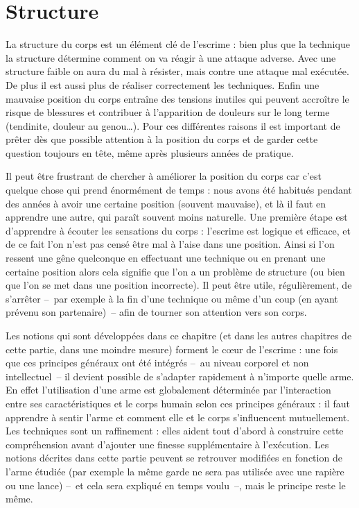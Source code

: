 \chapter{Structure}


La structure du corps est un élément clé de l'escrime : bien plus que la technique la structure détermine comment on va réagir à une attaque adverse.
Avec une structure faible on aura du mal à résister, mais contre une attaque mal exécutée.
De plus il est aussi plus de réaliser correctement les techniques.
Enfin une mauvaise position du corps entraîne des tensions inutiles qui peuvent accroître le risque de blessures et contribuer à l'apparition de douleurs sur le long terme (tendinite, douleur au genou…).
Pour ces différentes raisons il est important de prêter dès que possible attention à la position du corps et de garder cette question toujours en tête, même après plusieurs années de pratique.

Il peut être frustrant de chercher à améliorer la position du corps car c'est quelque chose qui prend énormément de temps : nous avons été habitués pendant des années à avoir une certaine position (souvent mauvaise), et là il faut en apprendre une autre, qui paraît souvent moins naturelle.
Une première étape est d'apprendre à écouter les sensations du corps : l'escrime est logique et efficace, et de ce fait l'on n'est pas censé être mal à l'aise dans une position.
Ainsi si l'on ressent une gêne quelconque en effectuant une technique ou en prenant une certaine position alors cela signifie que l'on a un problème de structure (ou bien que l'on se met dans une position incorrecte).
Il peut être utile, régulièrement, de s'arrêter -- par exemple à la fin d'une technique ou même d'un coup (en ayant prévenu son partenaire) -- afin de tourner son attention vers son corps.

Les notions qui sont développées dans ce chapitre (et dans les autres chapitres de cette partie, dans une moindre mesure) forment le cœur de l'escrime : une fois que ces principes généraux ont été intégrés -- au niveau corporel et non intellectuel -- il devient possible de s'adapter rapidement à n'importe quelle arme.
En effet l'utilisation d'une arme est globalement déterminée par l'interaction entre ses caractéristiques et le corps humain selon ces principes généraux : il faut apprendre à sentir l'arme et comment elle et le corps s'influencent mutuellement.
Les techniques sont un raffinement : elles aident tout d'abord à construire cette compréhension avant d'ajouter une finesse supplémentaire à l'exécution.
Les notions décrites dans cette partie peuvent se retrouver modifiées en fonction de l'arme étudiée (par exemple la même garde ne sera pas utilisée avec une rapière ou une lance) -- et cela sera expliqué en temps voulu --, mais le principe reste le même.

